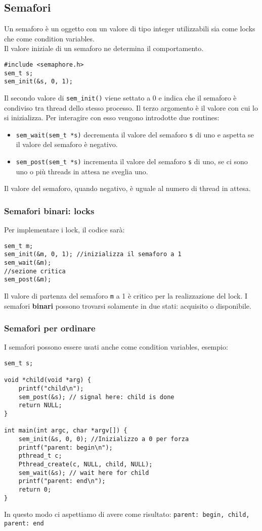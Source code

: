 \documentclass[12pt, twoside, letterpaper]{article}
\begin{document}
		\subsection{Semafori}
			Un semaforo è un oggetto con un valore di tipo integer utilizzabili sia come locks che come condition variables.
			\\Il valore iniziale di un semaforo ne determina il comportamento.
			\begin{lstlisting}[style=CStyle]
#include <semaphore.h>
sem_t s;
sem_init(&s, 0, 1);			\end{lstlisting}
			Il secondo valore di \texttt{sem\_init()} viene settato a 0 e indica che il semaforo è condiviso tra thread dello stesso processo. Il terzo argomento è il valore con cui lo si inizializza. Per interagire con esso vengono introdotte due routines: 
			\begin{itemize}
				\item \texttt{sem\_wait(sem\_t *s)} decrementa il valore del semaforo \texttt{s} di uno e aspetta se il valore del semaforo è negativo.
				\item \texttt{sem\_post(sem\_t *s)} incrementa il valore del semaforo \texttt{s} di uno, se ci sono uno o più threads in attesa ne sveglia uno.
			\end{itemize}
			
			Il valore del semaforo, quando negativo, è uguale al numero di thread in attesa.
			\subsubsection{Semafori binari: locks}
				Per implementare i lock, il codice sarà: 
				\begin{lstlisting}[style=CStyle]
sem_t m;
sem_init(&m, 0, 1); //inizializza il semaforo a 1
sem_wait(&m);
//sezione critica
sem_post(&m); 	\end{lstlisting}
				Il valore di partenza del semaforo \texttt{m} a 1  è critico per la realizzazione del lock. I semafori \textbf{binari} possono trovarsi solamente in due  stati: acquisito o disponibile. 
			
			\subsubsection{Semafori per ordinare}
				I semafori possono essere usati anche come condition variables, esempio: 
				\begin{lstlisting}[style=CStyle]
sem_t s;

void *child(void *arg) {
	printf("child\n");
	sem_post(&s); // signal here: child is done
	return NULL;
}

int main(int argc, char *argv[]) {
	sem_init(&s, 0, 0); //Inizializzo a 0 per forza
	printf("parent: begin\n");
	pthread_t c;
	Pthread_create(c, NULL, child, NULL);
	sem_wait(&s); // wait here for child
	printf("parent: end\n");
	return 0;
}				\end{lstlisting}
				In questo modo ci aspettiamo di avere come risultato: \texttt{parent: begin, child, parent: end}
			
\end{document}
